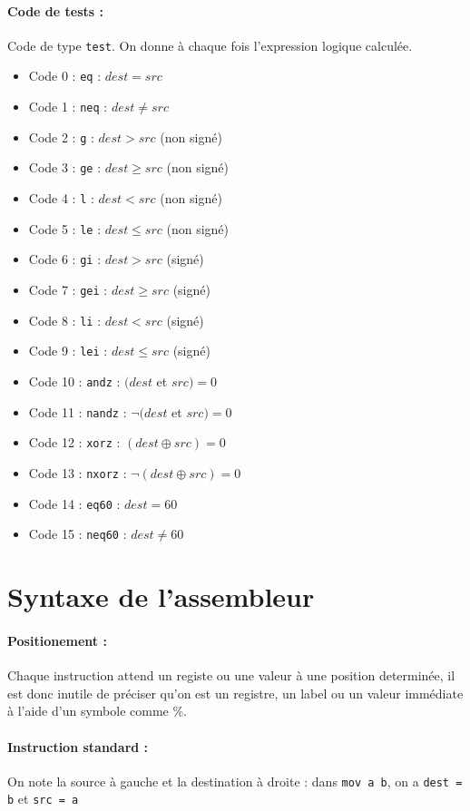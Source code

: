 \documentclass[12pt]{article}
\begin{document}
\paragraph{Code de tests :} Code de type \verb!test!. On donne à chaque fois
l'expression logique calculée.
\begin{itemize}
\item Code 0 : \verb!eq! : $dest = src$
\item Code 1 : \verb!neq! : $dest \neq src$
\item Code 2 : \verb!g! : $dest > src$ (non signé)
\item Code 3 : \verb!ge! : $dest \ge src$ (non signé)
\item Code 4 : \verb!l! : $dest < src$ (non signé)
\item Code 5 : \verb!le! : $dest \le src$ (non signé)
\item Code 6 : \verb!gi! : $dest > src$ (signé)
\item Code 7 : \verb!gei! : $dest \ge src$ (signé)
\item Code 8 : \verb!li! : $dest < src$ (signé)
\item Code 9 : \verb!lei! : $dest \le src$ (signé)
\item Code 10 : \verb!andz! : $(dest$ et $src) = 0$
\item Code 11 : \verb!nandz! : $\neg(dest$ et $src) = 0$
\item Code 12 : \verb!xorz! : $(dest \oplus src) = 0$
\item Code 13 : \verb!nxorz! : $\neg(dest \oplus src) = 0$
\item Code 14 : \verb!eq60! : $dest = 60$
\item Code 15 : \verb!neq60! : $dest \neq 60$
\end{itemize}

\section{Syntaxe de l'assembleur}

\paragraph{Positionement :} Chaque instruction attend un registe ou une valeur à
une position determinée, il est donc inutile de préciser qu'on est un registre,
un label ou un valeur immédiate à l'aide d'un symbole comme \%.


\paragraph{Instruction standard :} On note la source à gauche et la destination
à droite : dans \verb!mov a b!, on a \verb!dest = b! et \verb!src = a!
\end{document}
